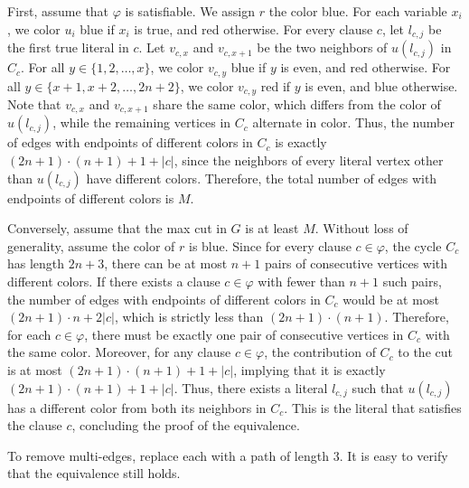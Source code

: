 \documentclass[12pt]{article}
\begin{document}
	\medskip
	
	First, assume that \(\varphi\) is satisfiable. We assign \(r\) the color
	blue. For each variable \(x_{i}\), we color \(u_{i}\) blue if \(x_{i}\) is
	true, and red otherwise. For every clause \(c\), let \(l_{c, j}\) be the
	first true literal in \(c\). Let \(v_{c, x}\) and \(v_{c, x + 1}\) be the
	two neighbors of \(u(l_{c, j})\) in \(C_{c}\). For all \(y \in \{1, 2,
	\ldots, x\}\), we color \(v_{c, y}\) blue if \(y\) is even, and red
	otherwise. For all \(y \in \{x + 1, x + 2, \ldots, 2n + 2\}\), we color
	\(v_{c, y}\) red if \(y\) is even, and blue otherwise. Note that
	\(v_{c, x}\) and \(v_{c, x + 1}\) share the same color, which differs from
	the color of \(u(l_{c, j})\), while the remaining vertices in \(C_{c}\)
	alternate in color. Thus, the number of edges with endpoints of different
	colors in \(C_{c}\) is exactly \((2n + 1) \cdot (n + 1) + 1 + |c|\), since
	the neighbors of every literal vertex other than \(u(l_{c, j})\) have
	different colors. Therefore, the total number of edges with endpoints of
	different colors is \(M\).
	
	\medskip
	
	Conversely, assume that the max cut in \(G\) is at least \(M\). Without loss
	of generality, assume the color of \(r\) is blue. Since for every clause \(c
	\in \varphi\), the cycle \(C_{c}\) has length \(2n + 3\), there can be at
	most \(n + 1\) pairs of consecutive vertices with different colors. If there
	exists a clause \(c \in \varphi\) with fewer than \(n + 1\) such pairs, the
	number of edges with endpoints of different colors in \(C_{c}\) would be at
	most \((2n + 1) \cdot n + 2|c|\), which is strictly less than \((2n + 1)
	\cdot (n + 1)\). Therefore, for each \(c \in \varphi\), there must be
	exactly one pair of consecutive vertices in \(C_{c}\) with the same color.
	Moreover, for any clause \(c \in \varphi\), the contribution of \(C_{c}\) to
	the cut is at most \((2n + 1) \cdot (n + 1) + 1 + |c|\), implying that it is
	exactly \((2n + 1) \cdot (n + 1) + 1 + |c|\). Thus, there exists a literal
	\(l_{c, j}\) such that \(u(l_{c, j})\) has a different color from both its
	neighbors in \(C_{c}\). This is the literal that satisfies the clause \(c\),
	concluding the proof of the equivalence.
	
	\medskip
	
	To remove multi-edges, replace each with a path of length \(3\). It is easy
	to verify that the equivalence still holds.
	
	\medskip
	
\end{document}
